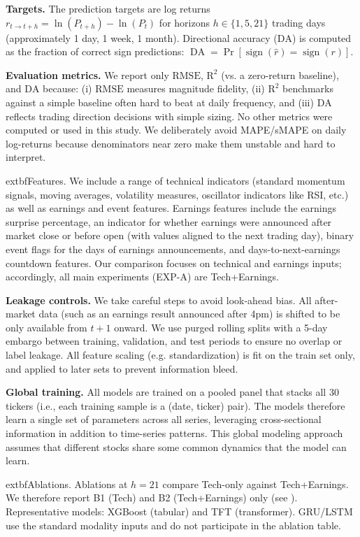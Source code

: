 \documentclass[10pt,twocolumn]{article}
\newcommand{\rmse}{\ensuremath{\mathrm{RMSE}}}
\newcommand{\rTwo}{\ensuremath{\mathrm{R}^2}}
\newcommand{\da}{\ensuremath{\mathrm{DA}}}
\begin{document}
        \textbf{Targets.} The prediction targets are log returns $r_{t\to t+h} = \ln(P_{t+h}) - \ln(P_t)$ for horizons $h\in\{1,5,21\}$ trading days (approximately 1 day, 1 week, 1 month). Directional accuracy (\da{}) is computed as the fraction of correct sign predictions: $\operatorname{DA} = \Pr[\operatorname{sign}(\hat r) = \operatorname{sign}(r)]$.

        \textbf{Evaluation metrics.} We report only \rmse{}, \rTwo{} (vs. a zero-return baseline), and \da{} because: (i) \rmse{} measures magnitude fidelity, (ii) \rTwo{} benchmarks against a simple baseline often hard to beat at daily frequency, and (iii) \da{} reflects trading direction decisions with simple sizing. No other metrics were computed or used in this study. We deliberately avoid MAPE/sMAPE on daily log-returns because denominators near zero make them unstable and hard to interpret.

	extbf{Features.} We include a range of technical indicators (standard momentum signals, moving averages, volatility measures, oscillator indicators like RSI, etc.) as well as earnings and event features. Earnings features include the earnings surprise percentage, an indicator for whether earnings were announced after market close or before open (with values aligned to the next trading day), binary event flags for the days of earnings announcements, and days-to-next-earnings countdown features. Our comparison focuses on technical and earnings inputs; accordingly, all main experiments (EXP-A) are Tech+Earnings.

\textbf{Leakage controls.} We take careful steps to avoid look-ahead bias. All after-market data (such as an earnings result announced after 4pm) is shifted to be only available from $t+1$ onward. We use purged rolling splits with a 5-day embargo between training, validation, and test periods to ensure no overlap or label leakage. All feature scaling (e.g. standardization) is fit on the train set only, and applied to later sets to prevent information bleed.

\textbf{Global training.} All models are trained on a pooled panel that stacks all 30 tickers (i.e., each training sample is a (date, ticker) pair). The models therefore learn a single set of parameters across all series, leveraging cross-sectional information in addition to time-series patterns. This global modeling approach assumes that different stocks share some common dynamics that the model can learn.

	extbf{Ablations.} Ablations at $h=21$ compare Tech-only against Tech+Earnings. We therefore report B1 (Tech) and B2 (Tech+Earnings) only (see ). Representative models: XGBoost (tabular) and TFT (transformer). GRU/LSTM use the standard modality inputs and do not participate in the ablation table.
\end{document}
